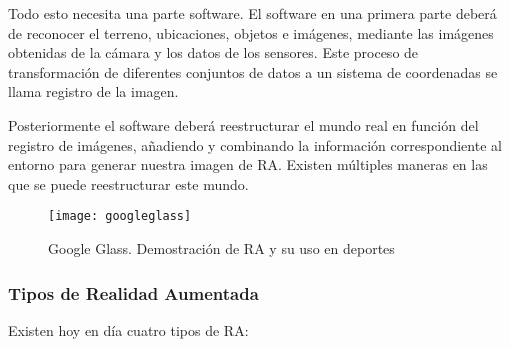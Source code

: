 Todo esto necesita una parte software. El software en una primera parte deberá de reconocer el terreno, ubicaciones, objetos e imágenes, mediante las imágenes obtenidas de la cámara y los datos de los sensores. Este proceso de transformación de diferentes conjuntos de datos a un sistema de coordenadas se llama registro de la imagen. 

Posteriormente el software deberá reestructurar el mundo real en función del registro de imágenes, añadiendo y combinando la información correspondiente al entorno para generar nuestra imagen de RA. Existen múltiples maneras en las que se puede reestructurar este mundo. 

\begin{figure}[h]
    \centering
    \texttt{[image: googleglass]}
    \caption{Google Glass. Demostración de RA y su uso en deportes}
    \label{fig:googleglass}
\end{figure}

\subsubsection{Tipos de Realidad Aumentada}

Existen hoy en día cuatro tipos de RA:

